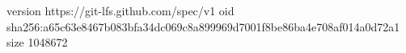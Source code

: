 version https://git-lfs.github.com/spec/v1
oid sha256:a65c63e8467b083bfa34dc069c8a899969d7001f8be86ba4e708af014a0d72a1
size 1048672
